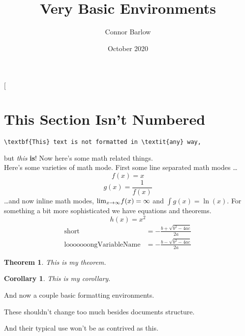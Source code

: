 [\documentclass{article}, \usepackage[utf8]{inputenc}, \usepackage{amsmath}, \title{Very Basic Environments}, \author{Connor Barlow}, \date{October 2020}, \newtheorem{thm}{Theorem}, \newtheorem{corr}{Corollary},
\begin{document}
\section*{This Section Isn't Numbered}
\begin{verbatim}
\textbf{This} text is not formatted in \textit{any} way,
\end{verbatim}
but \textit{this} \textbf{is}! Now here's some math related things.\\
Here's some varieties of math mode. First some line separated math modes \dots
\[f(x)=x\]
$$g(x)=\frac{1}{f(x)}$$
\dots and now inline math modes, \($lim$_{x\rightarrow\infty}f(x)=\infty\) and $\int g(x)=\ln(x)$. For something a bit more sophisticated we have equations and theorems.
\begin{equation}
h(x)=x^2
\end{equation}
\begin{eqnarray}
\text{short} &= -\frac{b+\sqrt{b^2-4ac}}{2a}\\
\text{looooooongVariableName} &= -\frac{b-\sqrt{b^2-4ac}}{2a}
\end{eqnarray}
\begin{thm}
This is my theorem.
\end{thm}
\begin{corr}
This is my corollary.
\end{corr}
\begin{center}
And now a couple basic formatting environments.
\end{center}
\begin{flushright}
These shouldn't change too much besides documents structure.
\end{flushright}
\begin{flushleft}
And their typical use won't be as contrived as this.
\end{flushleft}
\end{document}
